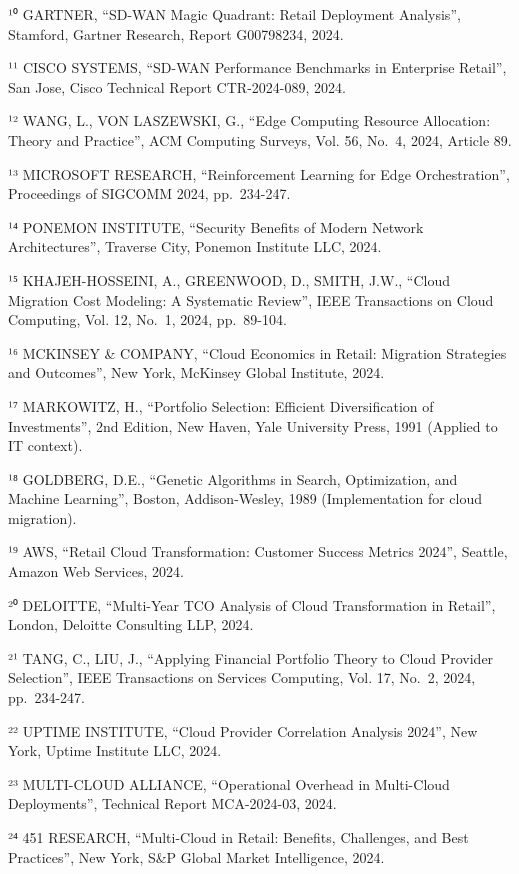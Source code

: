 \documentclass{report}
\begin{document}
¹⁰ GARTNER, ``SD-WAN Magic Quadrant: Retail Deployment Analysis'',
Stamford, Gartner Research, Report G00798234, 2024.

¹¹ CISCO SYSTEMS, ``SD-WAN Performance Benchmarks in Enterprise
Retail'', San Jose, Cisco Technical Report CTR-2024-089, 2024.

¹² WANG, L., VON LASZEWSKI, G., ``Edge Computing Resource Allocation:
Theory and Practice'', ACM Computing Surveys, Vol. 56, No.~4, 2024,
Article 89.

¹³ MICROSOFT RESEARCH, ``Reinforcement Learning for Edge
Orchestration'', Proceedings of SIGCOMM 2024, pp.~234-247.

¹⁴ PONEMON INSTITUTE, ``Security Benefits of Modern Network
Architectures'', Traverse City, Ponemon Institute LLC, 2024.

¹⁵ KHAJEH-HOSSEINI, A., GREENWOOD, D., SMITH, J.W., ``Cloud Migration
Cost Modeling: A Systematic Review'', IEEE Transactions on Cloud
Computing, Vol. 12, No.~1, 2024, pp.~89-104.

¹⁶ MCKINSEY \& COMPANY, ``Cloud Economics in Retail: Migration
Strategies and Outcomes'', New York, McKinsey Global Institute, 2024.

¹⁷ MARKOWITZ, H., ``Portfolio Selection: Efficient Diversification of
Investments'', 2nd Edition, New Haven, Yale University Press, 1991
(Applied to IT context).

¹⁸ GOLDBERG, D.E., ``Genetic Algorithms in Search, Optimization, and
Machine Learning'', Boston, Addison-Wesley, 1989 (Implementation for
cloud migration).

¹⁹ AWS, ``Retail Cloud Transformation: Customer Success Metrics 2024'',
Seattle, Amazon Web Services, 2024.

²⁰ DELOITTE, ``Multi-Year TCO Analysis of Cloud Transformation in
Retail'', London, Deloitte Consulting LLP, 2024.

²¹ TANG, C., LIU, J., ``Applying Financial Portfolio Theory to Cloud
Provider Selection'', IEEE Transactions on Services Computing, Vol. 17,
No.~2, 2024, pp.~234-247.

²² UPTIME INSTITUTE, ``Cloud Provider Correlation Analysis 2024'', New
York, Uptime Institute LLC, 2024.

²³ MULTI-CLOUD ALLIANCE, ``Operational Overhead in Multi-Cloud
Deployments'', Technical Report MCA-2024-03, 2024.

²⁴ 451 RESEARCH, ``Multi-Cloud in Retail: Benefits, Challenges, and Best
Practices'', New York, S\&P Global Market Intelligence, 2024.
\end{document}
